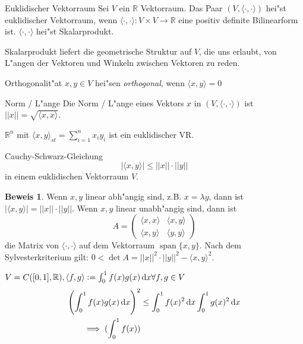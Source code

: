 \documentclass[oneside,fontsize=11pt,paper=a4,BCOR=0mm,DIV=12,automark,headsepline]{scrbook}
\DeclareMathOperator{\spn}{span}
\theoremstyle{remark}
\theoremstyle{definition}
\theoremstyle{definition}
\newtheorem*{prof}{Beweis}
\theoremstyle{remark}
\begin{document}
\begin{definition}{Euklidischer Vektorraum}{}
  Sei $V$ ein $\mathbb{R}$ Vektorraum. Das Paar $(V, \langle\cdot,\cdot\rangle)$ hei"st
  euklidischer Vektorraum, wenn $\langle\cdot,\cdot\rangle: V\times V \rightarrow \mathbb{R}$
  eine positiv definite Bilinearform ist. $\langle\cdot,\cdot\rangle$ hei"st Skalarprodukt.  
\end{definition}
Skalarprodukt liefert die geometrische Struktur auf $V$, die uns erlaubt, von L"angen der Vektoren und Winkeln zwischen Vektoren zu reden.
\begin{definition}{Orthogonalit"at}{}
  $x,y\in V$ hei"sen \emph{orthogonal}, wenn $\langle x,y\rangle=0$
\end{definition}
\begin{definition}{Norm / L"ange}{}
  Die Norm / L"ange eines Vektors \(x\) in \((V, \langle\cdot , \cdot\rangle)\) ist \(||x|| = \sqrt{\langle x,x\rangle}\).
\end{definition}
\begin{exa}
  \(\mathbb{R}^n\) mit \(\langle x, y\rangle_{st} = \sum_{i=1}^nx_iy_i\) ist ein euklidischer VR.
\end{exa}
\begin{satz}{Cauchy-Schwarz-Gleichung}{}
  \[|\langle x,y \rangle |\leq ||x||\cdot ||y||\] in einem euklidischen Vektorraum \(V\).
\end{satz}
\begin{prof}
  Wenn \(x, y\) linear abh"angig sind, z.B. \(x = \lambda y\), dann ist \(|\langle x, y\rangle | = ||x||\cdot ||y||\). Wenn \(x, y\) linear unabh"angig sind, dann ist \[A =
    \begin{pmatrix}
      \langle x, x\rangle & \langle x, y\rangle \\
      \langle x, y\rangle & \langle y, y\rangle
    \end{pmatrix}
  \] die Matrix von \(\langle\cdot , \cdot\rangle\) auf dem Vektorraum \(\spn\{x, y\}\). Nach dem Sylvesterkriterium gilt: \(0 < \det A = ||x||^2\cdot ||y||^2 - \langle x, y\rangle ^2\).
\end{prof}
\begin{exa}
  \(V = C([0, 1], \mathbb{R}), \langle f, g\rangle := \int_0^1f(x)g(x)\dif x \forall f, g \in V\)
  \begin{align*}
    \left(\int_0^1f(x)g(x)\dif x\right)^2 &\leq \int_0^1 f(x)^2\dif x\int_0^1 g(x)^2\dif x \\
    \implies (\int_0^1 f(x))
  \end{align*}
\end{exa}
\end{document}
